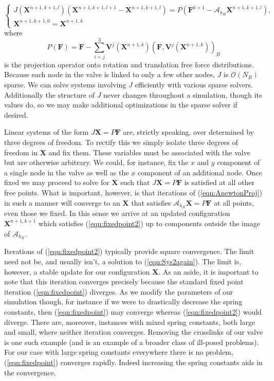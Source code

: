 \documentclass[preprint,12pt]{elsarticle}
\begin{document}
\begin{equation}
\left\{
\begin{gathered}
J(\mathbf{X}^{n+1,k+1,l})(\mathbf{X}^{n+1,k+1,l+1} - \mathbf{X}^{n+1,k+1,l}) = P(\mathbf{F}^{k+1} - \mathcal{A}_{h_B}\mathbf{X}^{n+1,k+1,l}),\\
\mathbf{X}^{n+1,k+1,0} = \mathbf{X}^{n+1,k}
\end{gathered}
\right.
\label{eqn:AnewtonProj}
\end{equation}
where
\begin{equation}
P(\mathbf{F}) = \mathbf{F} - \sum_{i=j}^3 \mathbf{V}^j(\mathbf{X}^{n+1,k})(\mathbf{F},\mathbf{V}^j(\mathbf{X}^{n+1,k}))_B
\label{eqn:project}
\end{equation}
is the projection operator onto rotation and translation free force distributions. Because each node in the valve is linked to only a few other nodes, $J$ is $\mathcal{O}(N_B)$ sparse. We can solve systems involving $J$ efficiently with various sparse solvers. Additionally the structure of $J$ never changes throughout a simulation, though its values do, so we may make additional optimizations in the sparse solver if desired.

Linear systems of the form $J\mathbf{X}=P\mathbf{F}$ are, strictly speaking, over determined by three degrees of freedom. To rectify this we simply isolate three degrees of freedom in $\mathbf{X}$ and fix them. These variables must be associated with the valve but are otherwise arbitrary. We could, for instance, fix the $x$ and $y$ component of a single node in the valve as well as the $x$ component of an additional node. Once fixed we may proceed to solve for $\mathbf{X}$ such that $J\mathbf{X}=P\mathbf{F}$ is satisfied at all other free points. What is important, however, is that iterations of (\ref{eqn:AnewtonProj}) in such a manner will converge to an $\mathbf{X}$ that satisfies $\mathcal{A}_{h_B}\mathbf{X}=P\mathbf{F}$ at all points, even those we fixed. In this sense we arrive at an updated configuration $\mathbf{X}^{n+1,k+1}$ which satisfies (\ref{eqn:fixedpoint2}) up to components outside the image of $\mathcal{A}_{h_B}$.

Iterations of (\ref{eqn:fixedpoint2}) typically provide square convergence. The limit need not be, and usually isn't, a solution to (\ref{eqn:Sys2again}). The limit is, however, a stable update for our configuration $\mathbf{X}$. As an aside, it is important to note that this iteration converges precisely because the standard fixed point iteration (\ref{eqn:fixedpoint}) diverges. As we modify the parameters of our simulation though, for instance if we were to drastically decrease the spring constants, then (\ref{eqn:fixedpoint}) may converge whereas (\ref{eqn:fixedpoint2}) would diverge. There are, moreover, instances with mixed spring constants, both large and small, where neither iteration converges. Removing the crosslinks of our valve is one such example (and is an example of a broader class of ill-posed problems).
For our case with large spring constants everywhere there is no problem, (\ref{eqn:fixedpoint}) converges rapidly. Indeed increasing the spring constants aids in the convergence.
\end{document}
